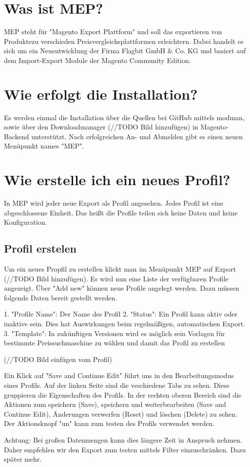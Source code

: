 \documentclass[a4paper]{article}
\begin{document}
\section{Was ist MEP?}
MEP steht für "Magento Export Plattform" und soll das exportieren von
Produktezu verschieden Preisvergleichsplattformen erleichtern. Dabei 
handelt es sich um ein Neuentwicklung der Firma Flagbit GmbH \& Co. KG 
und basiert auf dem Import-Export Module der Magento Community Edition.

\section{Wie erfolgt die Installation?}
Es werden einmal die Installation über die Quellen bei GitHub mittels 
modman, sowie über den Downloadmanager (//TODO Bild hinzufügen) in 
Magento-Backend unterstützt.  Nach erfolgreichen An- und Abmelden gibt 
es einen neuen Menüpunkt names "MEP".

\section{Wie erstelle ich ein neues Profil?}
In MEP wird jeder neue Export als Profil angesehen. Jedes Profil ist 
eine abgeschlossene Einheit. Das heißt die Profile teilen sich keine 
Daten und keine Konfiguration.

\subsection{Profil erstelen}
Um ein neues Propfil zu erstellen klickt man im Menüpunkt MEP auf 
Export (//TODO Bild hinzufügen). Es wird nun eine Liste der verfügbaren 
Profile angezeigt. Über "Add new" können neue Profile angelegt 
werden. Dazu müssen folgende Daten bereit gestellt werden.

1. "Profile Name": Der Name des Profil
2. "Status": Ein Profil kann aktiv oder inaktive sein. Dies hat 
Auswirkungen beim regelmäßigen, automatischen Export.
3. "Template": In zukünftigen Versionen wird es möglich sein Vorlagen 
für bestimmte Preissuchmaschine zu wählen und damit das Profil zu 
erstellen

(//TODO Bild einfügen vom Profil)

Ein Klick auf "Save and Continue Edit" führt uns in den 
Bearbeitungsmodus eines Profils. Auf der linken Seite sind die 
veschiedene Tabs zu sehen. Diese gruppieren die Eigenschaften des 
Profils. In der rechten oberen Bereich sind die Aktionen zum 
speichern (Save), speichern und weiterbearbeiten (Save and Continue 
Edit), Änderungen verwerfen (Reset) und löschen (Delete) zu sehen. 
Der Aktionsknopf "un" kann zum testen des Profils verwendet werden. 

Achtung: Bei großen Datenmengen kann dies längere Zeit in Anspruch 
nehmen. Daher empfehlen wir den Export zum testen mittels Filter 
einzuschränken. Dazu später mehr.
\end{document}
